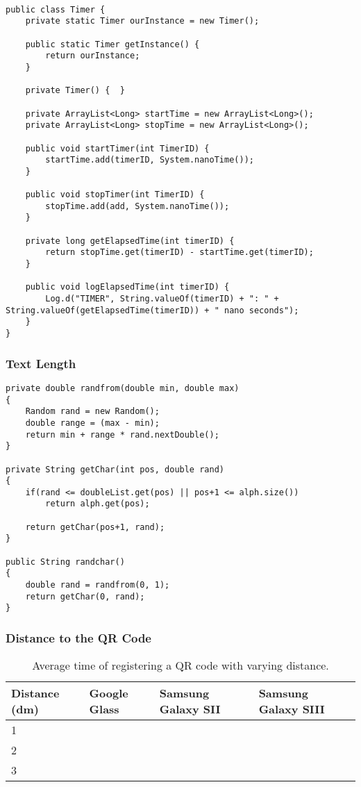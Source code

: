 \begin{lstlisting}

public class Timer {
	private static Timer ourInstance = new Timer();

	public static Timer getInstance() {
		return ourInstance;
	}
	
	private Timer() {  }
	
	private ArrayList<Long> startTime = new ArrayList<Long>();
	private ArrayList<Long> stopTime = new ArrayList<Long>();
	
	public void startTimer(int TimerID) {
		startTime.add(timerID, System.nanoTime());
	}
	
	public void stopTimer(int TimerID) {
		stopTime.add(add, System.nanoTime());
	}
	
	private long getElapsedTime(int timerID) {
		return stopTime.get(timerID) - startTime.get(timerID);
	}
	
	public void logElapsedTime(int timerID) {
		Log.d("TIMER", String.valueOf(timerID) + ": " + String.valueOf(getElapsedTime(timerID)) + " nano seconds");
	}
}

\end{lstlisting}

\subsubsection{Text Length}
\begin{lstlisting}
private double randfrom(double min, double max)
{
	Random rand = new Random();
	double range = (max - min);
	return min + range * rand.nextDouble();
}

private String getChar(int pos, double rand)
{
	if(rand <= doubleList.get(pos) || pos+1 <= alph.size())
		return alph.get(pos);
		
	return getChar(pos+1, rand);
}

public String randchar()
{
	double rand = randfrom(0, 1);
	return getChar(0, rand);
}
\end{lstlisting}

\subsubsection{Distance to the QR Code}

	\begin{table}[ht!]
    		\caption{Average time of registering a QR code with varying distance.} \label{tab:distanceAverage}
		\centering \begin{tabularx}{\textwidth}{l|X|X|X} \hline
		\textbf{Distance (dm)} & \textbf{Google Glass} & \textbf{Samsung Galaxy SII} & \textbf{Samsung Galaxy SIII} \\ \hline \hline
       
		1	&	&	&	\\ \hline
		2	&	&	&	\\ \hline
		3	&	&	&	\\ \hline
		
		\end{tabularx}
	\end{table}

